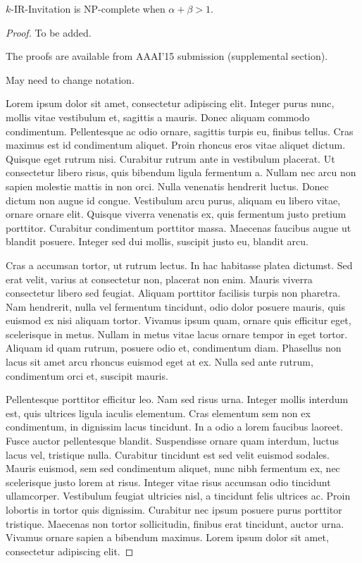 \begin{theorem} \label{SIP:thm:IR_invitation_NPC}
	$k$-IR-Invitation is NP-complete when $\alpha + \beta > 1$.
\end{theorem} 
\begin{proof} %
	To be added.
	
	The proofs are available from AAAI'15 submission (supplemental section).
	
	May need to change notation.
	
Lorem ipsum dolor sit amet, consectetur adipiscing elit. Integer purus nunc, mollis vitae vestibulum et, sagittis a mauris. Donec aliquam commodo condimentum. Pellentesque ac odio ornare, sagittis turpis eu, finibus tellus. Cras maximus est id condimentum aliquet. Proin rhoncus eros vitae aliquet dictum. Quisque eget rutrum nisi. Curabitur rutrum ante in vestibulum placerat. Ut consectetur libero risus, quis bibendum ligula fermentum a. Nullam nec arcu non sapien molestie mattis in non orci. Nulla venenatis hendrerit luctus. Donec dictum non augue id congue. Vestibulum arcu purus, aliquam eu libero vitae, ornare ornare elit. Quisque viverra venenatis ex, quis fermentum justo pretium porttitor. Curabitur condimentum porttitor massa. Maecenas faucibus augue ut blandit posuere. Integer sed dui mollis, suscipit justo eu, blandit arcu.

Cras a accumsan tortor, ut rutrum lectus. In hac habitasse platea dictumst. Sed erat velit, varius at consectetur non, placerat non enim. Mauris viverra consectetur libero sed feugiat. Aliquam porttitor facilisis turpis non pharetra. Nam hendrerit, nulla vel fermentum tincidunt, odio dolor posuere mauris, quis euismod ex nisi aliquam tortor. Vivamus ipsum quam, ornare quis efficitur eget, scelerisque in metus. Nullam in metus vitae lacus ornare tempor in eget tortor. Aliquam id quam rutrum, posuere odio et, condimentum diam. Phasellus non lacus sit amet arcu rhoncus euismod eget at ex. Nulla sed ante rutrum, condimentum orci et, suscipit mauris.

Pellentesque porttitor efficitur leo. Nam sed risus urna. Integer mollis interdum est, quis ultrices ligula iaculis elementum. Cras elementum sem non ex condimentum, in dignissim lacus tincidunt. In a odio a lorem faucibus laoreet. Fusce auctor pellentesque blandit. Suspendisse ornare quam interdum, luctus lacus vel, tristique nulla. Curabitur tincidunt est sed velit euismod sodales. Mauris euismod, sem sed condimentum aliquet, nunc nibh fermentum ex, nec scelerisque justo lorem at risus. Integer vitae risus accumsan odio tincidunt ullamcorper. Vestibulum feugiat ultricies nisl, a tincidunt felis ultrices ac. Proin lobortis in tortor quis dignissim. Curabitur nec ipsum posuere purus porttitor tristique. Maecenas non tortor sollicitudin, finibus erat tincidunt, auctor urna. Vivamus ornare sapien a bibendum maximus. Lorem ipsum dolor sit amet, consectetur adipiscing elit.


\end{proof}
